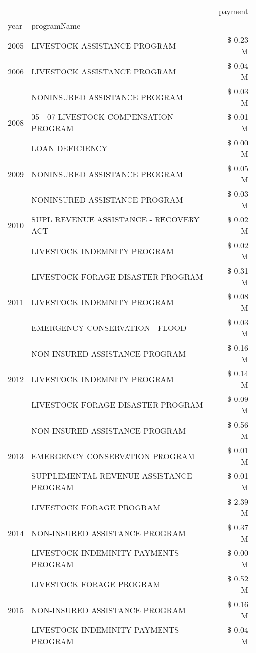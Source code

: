 \begin{tabular}{llr}
\toprule
 &  & payment \\
year & programName &  \\
\midrule
2005 & LIVESTOCK ASSISTANCE PROGRAM & \$ 0.23 M \\
\cline{1-3}
2006 & LIVESTOCK ASSISTANCE PROGRAM & \$ 0.04 M \\
\cline{1-3}
\multirow[t]{3}{*}{2008} & NONINSURED ASSISTANCE PROGRAM & \$ 0.03 M \\
 & 05 - 07 LIVESTOCK COMPENSATION PROGRAM & \$ 0.01 M \\
 & LOAN DEFICIENCY & \$ 0.00 M \\
\cline{1-3}
2009 & NONINSURED ASSISTANCE PROGRAM & \$ 0.05 M \\
\cline{1-3}
\multirow[t]{3}{*}{2010} & NONINSURED ASSISTANCE PROGRAM & \$ 0.03 M \\
 & SUPL REVENUE ASSISTANCE - RECOVERY ACT & \$ 0.02 M \\
 & LIVESTOCK INDEMNITY PROGRAM & \$ 0.02 M \\
\cline{1-3}
\multirow[t]{3}{*}{2011} & LIVESTOCK FORAGE DISASTER PROGRAM & \$ 0.31 M \\
 & LIVESTOCK INDEMNITY PROGRAM & \$ 0.08 M \\
 & EMERGENCY CONSERVATION - FLOOD & \$ 0.03 M \\
\cline{1-3}
\multirow[t]{3}{*}{2012} & NON-INSURED ASSISTANCE PROGRAM & \$ 0.16 M \\
 & LIVESTOCK INDEMNITY PROGRAM & \$ 0.14 M \\
 & LIVESTOCK FORAGE DISASTER PROGRAM & \$ 0.09 M \\
\cline{1-3}
\multirow[t]{3}{*}{2013} & NON-INSURED ASSISTANCE PROGRAM & \$ 0.56 M \\
 & EMERGENCY CONSERVATION PROGRAM & \$ 0.01 M \\
 & SUPPLEMENTAL REVENUE ASSISTANCE PROGRAM & \$ 0.01 M \\
\cline{1-3}
\multirow[t]{3}{*}{2014} & LIVESTOCK FORAGE PROGRAM & \$ 2.39 M \\
 & NON-INSURED ASSISTANCE PROGRAM & \$ 0.37 M \\
 & LIVESTOCK INDEMINITY PAYMENTS PROGRAM & \$ 0.00 M \\
\cline{1-3}
\multirow[t]{3}{*}{2015} & LIVESTOCK FORAGE PROGRAM & \$ 0.52 M \\
 & NON-INSURED ASSISTANCE PROGRAM & \$ 0.16 M \\
 & LIVESTOCK INDEMINITY PAYMENTS PROGRAM & \$ 0.04 M \\

\end{tabular}
